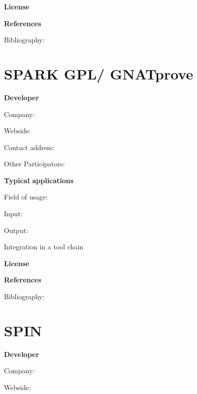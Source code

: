 \documentclass{./template/openetcs_report}
\begin{document}


	\textbf{License}


	\textbf{References}

	Bibliography:


\section{SPARK GPL/ GNATprove}

	\textbf{Developer}

	Company: 

	Webside:

	Contact address:

	Other  Participators:



	\textbf{Typical applications}

	Field of usage:


	Input:

	Output:





	Integration in a tool chain



	\textbf{License}


	\textbf{References}

	Bibliography:


\section{SPIN}

	\textbf{Developer}

	Company: 

	Webside:
\end{document}
